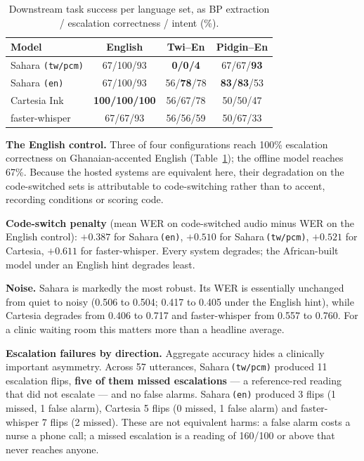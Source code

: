 \documentclass[a4paper,10pt,twocolumn]{article}
\begin{document}
\begin{table}[t]
\centering\small
\caption{Downstream task success per language set, as BP extraction /
escalation correctness / intent (\%).}
\label{tab:task}
\setlength{\tabcolsep}{2.6pt}
\begin{tabular}{@{}lccc@{}}
\toprule
Model & English & Twi--En & Pidgin--En \\
\midrule
Sahara \texttt{(tw/pcm)} & 67/100/93 & \textbf{0/0/4} & 67/67/\textbf{93} \\
Sahara \texttt{(en)} & 67/100/93 & 56/\textbf{78}/78 & \textbf{83/83}/53 \\
Cartesia Ink & \textbf{100/100/100} & 56/67/78 & 50/50/47 \\
faster-whisper & 67/67/93 & 56/56/59 & 50/67/33 \\
\bottomrule
\end{tabular}
\end{table}

\textbf{The English control.} Three of four configurations reach 100\% escalation
correctness on Ghanaian-accented English (Table~\ref{tab:task}); the offline
model reaches 67\%. Because the hosted systems are equivalent here, their
degradation on the code-switched sets is attributable to code-switching rather
than to accent, recording conditions or scoring code.

\textbf{Code-switch penalty} (mean WER on code-switched audio minus WER on the
English control): $+0.387$ for Sahara\,\texttt{(en)}, $+0.510$ for
Sahara\,\texttt{(tw/pcm)}, $+0.521$ for Cartesia, $+0.611$ for faster-whisper.
Every system degrades; the African-built model under an English hint degrades
least.

\textbf{Noise.} Sahara is markedly the most robust. Its WER is essentially
unchanged from quiet to noisy (0.506 to 0.504; 0.417 to 0.405 under the English
hint), while Cartesia degrades from 0.406 to 0.717 and faster-whisper from 0.557
to 0.760. For a clinic waiting room this matters more than a headline average.

\textbf{Escalation failures by direction.} Aggregate accuracy hides a clinically
important asymmetry. Across 57 utterances, Sahara\,\texttt{(tw/pcm)} produced 11
escalation flips, \textbf{five of them missed escalations} --- a reference-red
reading that did not escalate --- and no false alarms. Sahara\,\texttt{(en)}
produced 3 flips (1 missed, 1 false alarm), Cartesia 5 flips (0 missed, 1 false
alarm) and faster-whisper 7 flips (2 missed). These are not equivalent harms: a
false alarm costs a nurse a phone call; a missed escalation is a reading of
160/100 or above that never reaches anyone.
\end{document}

